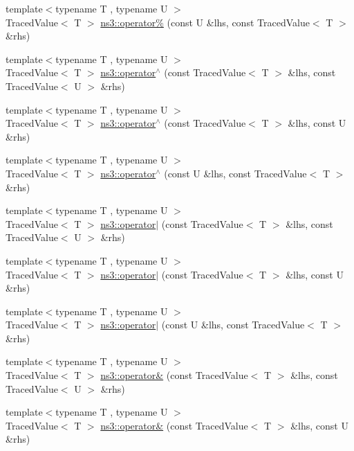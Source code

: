 \begin{DoxyCompactItemize}
\item 
{\footnotesize template$<$typename T , typename U $>$ }\\Traced\+Value$<$ T $>$ \hyperlink{group__tracing_ga225d35406003f51f61f227582b00b77a}{ns3\+::operator\%} (const U \&lhs, const Traced\+Value$<$ T $>$ \&rhs)
\item 
{\footnotesize template$<$typename T , typename U $>$ }\\Traced\+Value$<$ T $>$ \hyperlink{group__tracing_gae26a80fbd89c38b3c155db08c34200e0}{ns3\+::operator$^\wedge$} (const Traced\+Value$<$ T $>$ \&lhs, const Traced\+Value$<$ U $>$ \&rhs)
\item 
{\footnotesize template$<$typename T , typename U $>$ }\\Traced\+Value$<$ T $>$ \hyperlink{group__tracing_ga6a9898acf7351314be73d7a9ccf6c150}{ns3\+::operator$^\wedge$} (const Traced\+Value$<$ T $>$ \&lhs, const U \&rhs)
\item 
{\footnotesize template$<$typename T , typename U $>$ }\\Traced\+Value$<$ T $>$ \hyperlink{group__tracing_ga74ae4ddefb52a4ad3d30e9fc6dd17970}{ns3\+::operator$^\wedge$} (const U \&lhs, const Traced\+Value$<$ T $>$ \&rhs)
\item 
{\footnotesize template$<$typename T , typename U $>$ }\\Traced\+Value$<$ T $>$ \hyperlink{group__tracing_gaddfa7ce147f93ae8281ed0579bd2dfca}{ns3\+::operator$\vert$} (const Traced\+Value$<$ T $>$ \&lhs, const Traced\+Value$<$ U $>$ \&rhs)
\item 
{\footnotesize template$<$typename T , typename U $>$ }\\Traced\+Value$<$ T $>$ \hyperlink{group__tracing_gafc8255bda985965e99f43ee32bc0bf9f}{ns3\+::operator$\vert$} (const Traced\+Value$<$ T $>$ \&lhs, const U \&rhs)
\item 
{\footnotesize template$<$typename T , typename U $>$ }\\Traced\+Value$<$ T $>$ \hyperlink{group__tracing_ga11f07bd979f678245e72777432628220}{ns3\+::operator$\vert$} (const U \&lhs, const Traced\+Value$<$ T $>$ \&rhs)
\item 
{\footnotesize template$<$typename T , typename U $>$ }\\Traced\+Value$<$ T $>$ \hyperlink{group__tracing_ga4185eb99c134307ac49a1b3722de3389}{ns3\+::operator\&} (const Traced\+Value$<$ T $>$ \&lhs, const Traced\+Value$<$ U $>$ \&rhs)
\item 
{\footnotesize template$<$typename T , typename U $>$ }\\Traced\+Value$<$ T $>$ \hyperlink{group__tracing_ga55cd69c0b0d59a879b0a255b821a66f6}{ns3\+::operator\&} (const Traced\+Value$<$ T $>$ \&lhs, const U \&rhs)

\end{DoxyCompactItemize}
